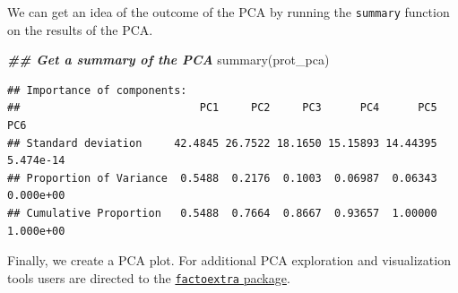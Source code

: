 \documentclass[9pt,a4paper,]{extarticle}
\newenvironment{Shaded}{\begin{snugshade}}{\end{snugshade}}
\newcommand{\DocumentationTok}[1]{\textcolor[rgb]{0.56,0.35,0.01}{\textbf{\textit{#1}}}}
\newcommand{\FunctionTok}[1]{\textcolor[rgb]{0.00,0.00,0.00}{#1}}
\newcommand{\NormalTok}[1]{#1}
\begin{document}
We can get an idea of the outcome of the PCA by running the \texttt{summary} function
on the results of the PCA.

\begin{Shaded}
\begin{Highlighting}[]
\DocumentationTok{\#\# Get a summary of the PCA}
\FunctionTok{summary}\NormalTok{(prot\_pca)}
\end{Highlighting}
\end{Shaded}

\begin{verbatim}
## Importance of components:
##                            PC1     PC2     PC3      PC4      PC5       PC6
## Standard deviation     42.4845 26.7522 18.1650 15.15893 14.44395 5.474e-14
## Proportion of Variance  0.5488  0.2176  0.1003  0.06987  0.06343 0.000e+00
## Cumulative Proportion   0.5488  0.7664  0.8667  0.93657  1.00000 1.000e+00
\end{verbatim}

Finally, we create a PCA plot. For additional PCA exploration and visualization
tools users are directed to the \href{https://cran.r-project.org/web/packages/factoextra/index.html}{\texttt{factoextra} package}.
\end{document}
